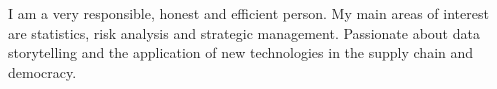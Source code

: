 \begin{flushleft}
    I am a very responsible, honest and efficient person.
    My main areas of interest are statistics, risk analysis and strategic management.
    Passionate about data storytelling and the application of new technologies in the supply chain and democracy.
\end{flushleft}